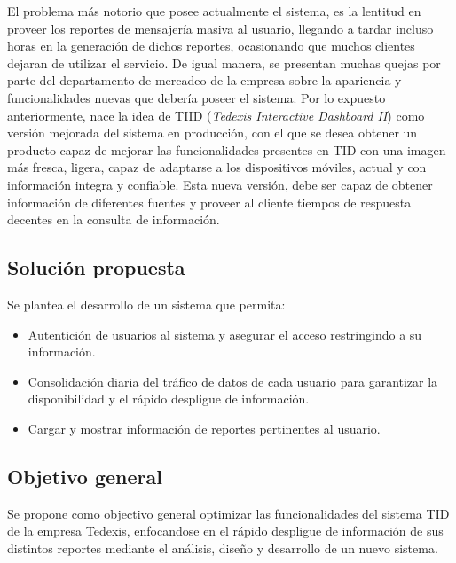 \indent El problema más notorio que posee actualmente el sistema, es la lentitud en proveer los reportes de mensajería masiva al usuario, llegando a tardar incluso horas en la generación de dichos reportes, ocasionando que muchos clientes dejaran de utilizar el servicio. De igual manera, se presentan muchas quejas por parte del departamento de mercadeo de la empresa sobre la apariencia y funcionalidades nuevas que debería poseer el sistema.
\newline
\newline
\indent Por lo expuesto anteriormente, nace la idea de TIID (\textit{Tedexis Interactive Dashboard II}) como versión mejorada del sistema en producción, con el que se desea obtener un producto capaz de mejorar las funcionalidades presentes en TID con una imagen más fresca, ligera, capaz de adaptarse a los dispositivos móviles, actual y con información integra y confiable. Esta nueva versión, debe ser capaz de obtener información de diferentes fuentes y proveer al cliente tiempos de respuesta decentes en la consulta de información.

\subsection*{Solución propuesta}
Se plantea el desarrollo de un sistema que permita:
\begin{itemize}[noitemsep,nolistsep]
\item Autentición de usuarios al sistema y asegurar el acceso restringindo a su información.
\item Consolidación diaria del tráfico de datos de cada usuario para garantizar la disponibilidad y el rápido despligue de información.
\item Cargar y mostrar información de reportes pertinentes al usuario.
\end{itemize}

\subsection*{Objetivo general}
Se propone como objectivo general optimizar las funcionalidades del sistema TID de la empresa Tedexis, enfocandose en el rápido despligue de información de sus distintos reportes mediante el análisis, diseño y desarrollo de un nuevo sistema.

